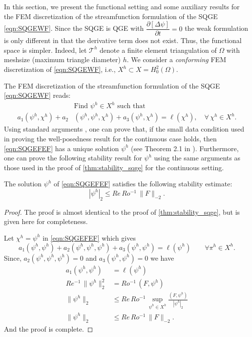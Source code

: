 In this section, we present the functional setting and some auxiliary results for the FEM
discretization of the streamfunction formulation of the SQGE \eqref{eqn:SQGEWF}. Since the SQGE is
QGE with $\dfrac{\partial [\Delta \psi]}{\partial t} = 0$ the weak formulation is only different in
that the derivative term does not exist. Thus, the functional space is simpler. Indeed,
let $\mathcal{T}^h$ denote a finite element triangulation of $\Omega$ with meshsize (maximum
triangle diameter) $h$. We consider a \emph{conforming} FEM discretization of \eqref{eqn:SQGEWF},
i.e., $X^h \subset X = H_0^2(\Omega)$.

The FEM discretization of the streamfunction formulation of the SQGE \eqref{eqn:SQGEWF} reads:
\begin{equation}
  \begin{split}
    &\text{Find } \psi^h \in X^h \text{ such that} \\
    a_1(\psi^h,\chi^h) + a_2&(\psi^h,\psi^h,\chi^h)
      + a_3(\psi^h,\chi^h) = \ell(\chi^h),\quad \forall \, \chi^h \in X^h.
    \label{eqn:SQGEFEF}
  \end{split}
\end{equation}
Using standard arguments \cite{Girault79,Girault86}, one can prove that, if the small data condition
used in proving the well-posedness result for the continuous case holds, then \eqref{eqn:SQGEFEF}
has a unique solution $\psi^h$ (see Theorem 2.1 in \cite{Cayco86}). Furthermore, one can prove the
following stability result for $\psi^h$ using the same arguments as those used in the proof of
\eqref{thm:stability_sqge} for the continuous setting.
\begin{thm} \label{thm:stability_fem_sqge} The
  solution $\psi^h$ of \eqref{eqn:SQGEFEF} satisfies the following stability estimate:
 \begin{equation}
   |\psi^h|_2 \le Re \, Ro^{-1} \, \| F \|_{-2} .
   \label{eqn:stability_fem_sqge}
 \end{equation}
\end{thm}
\begin{proof}
  The proof is almost identical to the proof of \autoref{thm:stability_sqge}, but is given here for
  completeness.

  Let $\chi^h = \psi^h$ in \eqref{eqn:SQGEFEF} which gives
  \begin{equation*}
    a_1(\psi^h,\psi^h) + a_2(\psi^h,\psi^h,\psi^h) + a_3(\psi^h,\psi^h) = \ell(\psi^h)\qquad  \forall
    \pi^h \in X^h.
  \end{equation*}
  Since, $a_2(\psi^h, \psi^h, \psi^h) =0$ and $a_3(\psi^h,\psi^h)=0$ we have
  \begin{align*}
    a_1(\psi^h,\psi^h) &= \ell(\psi^h) \\
    Re^{-1}\, \|\psi^h\|_2^2 &= Ro^{-1}\, (F,\psi^h) \\
    \|\psi^h\|_2 &\le Re\, Ro^{-1}\,\sup_{\psi^h \in X^h} \frac{(F,\psi^h)}{|\psi^h|_2} \\
    \|\psi^h\|_2 &\le Re\, Ro^{-1}\, \|F\|_{-2}.
  \end{align*}
  And the proof is complete.
\end{proof}

